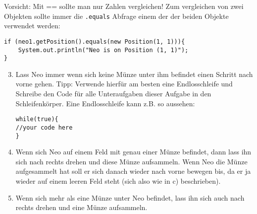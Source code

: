 \begin{Infobox}[\lstinline{==} und \lstinline{.equals()}]
	Vorsicht: Mit == sollte man nur Zahlen vergleichen! 
	Zum vergleichen von zwei Objekten sollte immer die \lstinline{.equals} Abfrage einem der der beiden Objekte verwendet werden:

	\begin{lstlisting}
if (neo1.getPosition().equals(new Position(1, 1))){
	System.out.println("Neo is on Position (1, 1)");
}
	\end{lstlisting}

\end{Infobox}


\begin{enumerate}\setcounter{enumi}{2}
	\item
		Lass Neo immer wenn sich keine Münze unter ihm befindet einen Schritt nach vorne gehen.
		Tipp: Verwende hierfür am besten eine Endlosschleife und Schreibe den Code für alle Unteraufgaben dieser Aufgabe in den Schleifenkörper.
		Eine Endlosschleife kann z.B. so aussehen:
	\begin{lstlisting}
while(true){
//your code here
}
	\end{lstlisting}

	\item
		Wenn sich Neo auf einem Feld mit genau einer Münze befindet, dann lass ihn sich nach rechts drehen und diese Münze aufsammeln. 
		Wenn Neo die Münze aufgesammelt hat soll er sich danach wieder nach vorne bewegen bis, da er ja wieder auf einem leeren Feld steht (sich also wie in c) beschrieben).

	\item
		Wenn sich mehr als eine Münze unter Neo befindet, lass ihn sich auch nach rechts drehen und eine Münze aufsammeln.
\end{enumerate}


